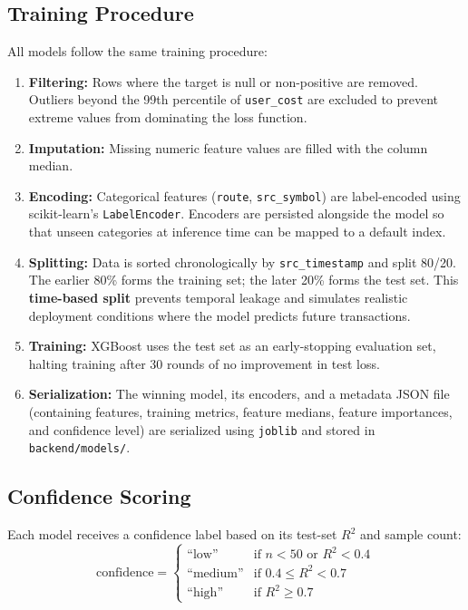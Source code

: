 \subsection{Training Procedure}

All models follow the same training procedure:

\begin{enumerate}
    \item \textbf{Filtering:} Rows where the target is null or non-positive are removed. Outliers beyond the 99th percentile of \texttt{user\_cost} are excluded to prevent extreme values from dominating the loss function.
    \item \textbf{Imputation:} Missing numeric feature values are filled with the column median.
    \item \textbf{Encoding:} Categorical features (\texttt{route}, \texttt{src\_symbol}) are label-encoded using scikit-learn's \texttt{LabelEncoder}. Encoders are persisted alongside the model so that unseen categories at inference time can be mapped to a default index.
    \item \textbf{Splitting:} Data is sorted chronologically by \texttt{src\_timestamp} and split 80/20. The earlier 80\% forms the training set; the later 20\% forms the test set. This \textbf{time-based split} prevents temporal leakage and simulates realistic deployment conditions where the model predicts future transactions.
    \item \textbf{Training:} XGBoost uses the test set as an early-stopping evaluation set, halting training after 30 rounds of no improvement in test loss.
    \item \textbf{Serialization:} The winning model, its encoders, and a metadata JSON file (containing features, training metrics, feature medians, feature importances, and confidence level) are serialized using \texttt{joblib} and stored in \texttt{backend/models/}.
\end{enumerate}

\subsection{Confidence Scoring}

Each model receives a confidence label based on its test-set $R^2$ and sample count:
\begin{equation}
\text{confidence} = \begin{cases}
\text{``low''} & \text{if } n < 50 \text{ or } R^2 < 0.4 \\
\text{``medium''} & \text{if } 0.4 \leq R^2 < 0.7 \\
\text{``high''} & \text{if } R^2 \geq 0.7
\end{cases}
\end{equation}


